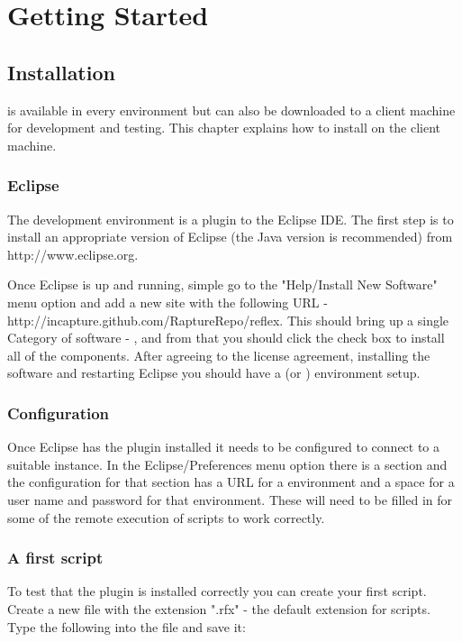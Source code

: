 \part{Getting Started}

\chapter{Installation}

\Reflex is available in every \Rapture environment but can also be downloaded to a client machine for development and testing. This chapter explains how to install \Reflex on the client machine.

\section{Eclipse}
The \Reflex development environment is a plugin to the Eclipse IDE. The first step is to install an appropriate version of Eclipse (the Java version is recommended) from http://www.eclipse.org.

Once Eclipse is up and running, simple go to the "Help/Install New Software" menu option and add a new site with the following URL - http://incapture.github.com/RaptureRepo/reflex. This should bring up a single Category of software - \Rapture, and from that you should click the check box to install all of the components. After agreeing to the license agreement, installing the software and restarting Eclipse you should have a \Rapture (or \Reflex) environment setup.

\section{Configuration}

Once Eclipse has the \Reflex plugin installed it needs to be configured to connect to a suitable \Rapture instance. In the Eclipse/Preferences menu option there is a \Rapture section and the configuration for that section has a URL for a \Rapture environment and a space for a user name and password for that environment. These will need to be filled in for some of the remote execution of \Reflex scripts to work correctly.

\section{A first script}
To test that the plugin is installed correctly you can create your first \Reflex script. Create a new file with the extension ".rfx" - the default extension for \Reflex scripts. Type the following into the file and save it:

